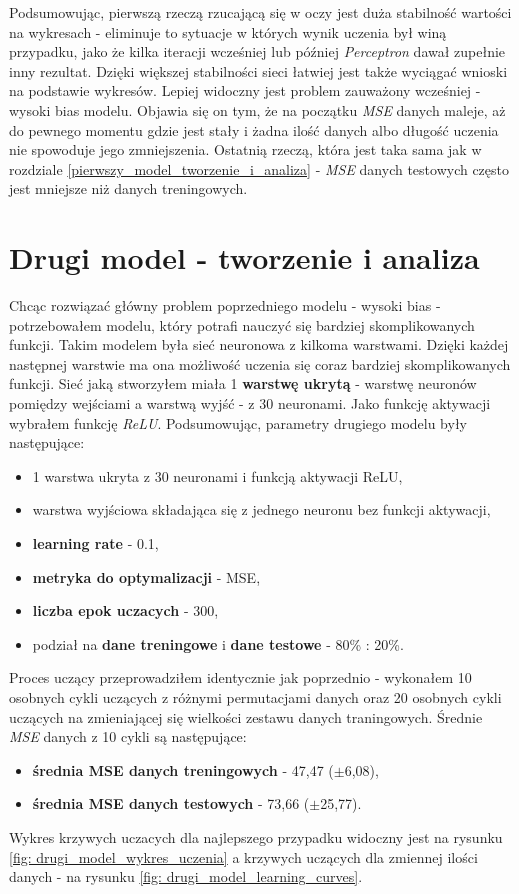 \documentclass[12pt]{aghdpl}
\begin{document}
		Podsumowując, pierwszą rzeczą rzucającą się w oczy jest duża stabilność wartości na wykresach - eliminuje to sytuacje w których wynik uczenia był winą przypadku, jako że kilka iteracji wcześniej lub później \textit{Perceptron} dawał zupełnie inny rezultat. Dzięki większej stabilności sieci łatwiej jest także wyciągać wnioski na podstawie wykresów. Lepiej widoczny jest problem zauważony wcześniej - wysoki bias modelu. Objawia się on tym, że na początku \textit{MSE} danych maleje, aż do pewnego momentu gdzie jest stały i żadna ilość danych albo długość uczenia nie spowoduje jego zmniejszenia. Ostatnią rzeczą, która jest taka sama jak w rozdziale \ref{pierwszy_model_tworzenie_i_analiza} - \textit{MSE} danych testowych często jest mniejsze niż danych treningowych.
		
		\section{Drugi model - tworzenie i analiza} \label{drugi_model_tworzenie_i_analiza}
		Chcąc rozwiązać główny problem poprzedniego modelu - wysoki bias - potrzebowałem modelu, który potrafi nauczyć się bardziej skomplikowanych funkcji. Takim modelem była sieć neuronowa z kilkoma warstwami. Dzięki każdej następnej warstwie ma ona możliwość uczenia się coraz bardziej skomplikowanych funkcji. Sieć jaką stworzyłem miała 1 \textbf{warstwę ukrytą} - warstwę neuronów pomiędzy wejściami a warstwą wyjść - z 30 neuronami. Jako funkcję aktywacji wybrałem funkcję \textit{ReLU}.
		Podsumowując, parametry drugiego modelu były następujące:
		\begin{itemize}
			\item 1 warstwa ukryta z 30 neuronami i funkcją aktywacji ReLU,
			\item warstwa wyjściowa składająca się z jednego neuronu bez funkcji aktywacji,
			\item \textbf{learning rate} - 0.1,
			\item \textbf{metryka do optymalizacji} - MSE,
			\item \textbf{liczba epok uczacych} - 300,
			\item podział na \textbf{dane treningowe} i \textbf{dane testowe} - 80\% : 20\%.
		\end{itemize}
		
		Proces uczący przeprowadziłem identycznie jak poprzednio - wykonałem 10 osobnych cykli uczących z różnymi permutacjami danych oraz 20 osobnych cykli uczących na zmieniającej się wielkości zestawu danych traningowych. Średnie \textit{MSE} danych z 10 cykli są następujące:
		\begin{itemize}
		\item \textbf{średnia MSE danych treningowych} - 47,47 ($\pm$6,08),
		\item \textbf{średnia MSE danych testowych} - 73,66 ($\pm$25,77).
		\end{itemize}
		Wykres krzywych uczacych dla najlepszego przypadku widoczny jest na rysunku \ref{fig: drugi_model_wykres_uczenia} a krzywych uczących dla zmiennej ilości danych - na rysunku \ref{fig: drugi_model_learning_curves}.
		
\end{document}
